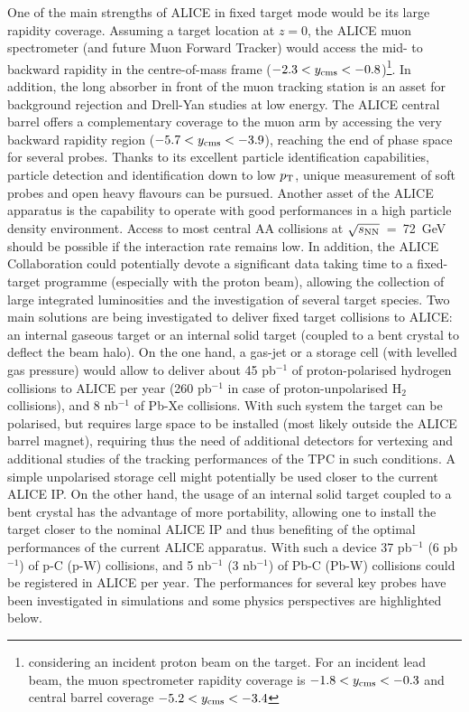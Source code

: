 \documentclass[../report.tex]{subfiles}
\begin{document}
One of the main strengths of ALICE in fixed target mode would be its large rapidity coverage. Assuming a target location at $z=0$, the ALICE muon spectrometer (and future Muon Forward Tracker) would access the mid- to backward rapidity in the centre-of-mass frame ($-2.3 < y_{\rm cms} < -0.8$)\footnote{\label{note1} considering an incident proton beam on the target. For an incident lead beam, the muon spectrometer rapidity coverage is $-1.8 < y_{\rm cms} < -0.3$ and central barrel coverage $-5.2 < y_{\rm cms} < -3.4$}. In addition, the long absorber in front of the muon tracking station is an asset for background rejection and Drell-Yan studies at low energy. The ALICE central barrel offers a complementary coverage to the muon arm by accessing the very backward rapidity region ($-5.7  < y_{\rm cms} < -3.9$), reaching the end of phase space for several probes. Thanks to its excellent particle identification capabilities, particle detection and identification down to low $p_{\rm T}$, unique measurement of soft probes and open heavy flavours can be pursued. Another asset of the ALICE apparatus is the capability to operate with good performances in a high particle density environment. Access to most central AA collisions at $\sqrt{s_{\rm NN}}$~=~72~GeV should be possible if the interaction rate remains low. In addition, the ALICE Collaboration could potentially devote a significant data taking time to a fixed-target programme (especially with the proton beam), allowing the collection of large integrated luminosities and the investigation of several target species. Two main solutions are being investigated to deliver fixed target collisions to ALICE: an internal gaseous target or an internal solid target (coupled to a bent crystal to deflect the beam halo). On the one hand, a gas-jet or a storage cell (with levelled gas pressure) would allow to deliver about 45 pb$^{-1}$ of proton-polarised hydrogen collisions to ALICE per year (260 pb$^{-1}$  in case of proton-unpolarised H$_{2}$ collisions), and 8 nb$^{-1}$ of Pb-Xe collisions. With such system the target can be polarised, but requires large space to be installed (most likely outside the ALICE barrel magnet), requiring thus the need of additional detectors for vertexing and additional studies of the tracking performances of the TPC in such conditions. A simple unpolarised storage cell might potentially be used closer to the current ALICE IP. On the other hand, the usage of an internal solid target coupled to a bent crystal has the advantage of more portability, allowing one to install the target closer to the nominal ALICE IP and thus benefiting of the optimal performances of the current ALICE apparatus. With such a device 37 pb$^{-1}$ (6 pb$^{-1}$) of p-C (p-W) collisions, and 5 nb$^{-1}$ (3 nb$^{-1}$) of Pb-C (Pb-W) collisions could be registered in ALICE per year. The performances for several key probes have been investigated in simulations and some physics perspectives are highlighted below. 
\end{document}
